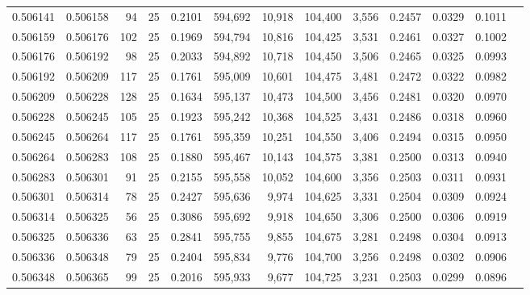 \begin{tabular}{rrrrrrrrrrrrr}
0.506141 & 0.506158 &  94 &  25 &                                     0.2101 & 594,692 &  10,918 & 104,400 &   3,556 & 0.2457 & 0.0329 & 0.1011 \\
0.506159 & 0.506176 & 102 &  25 &                                     0.1969 & 594,794 &  10,816 & 104,425 &   3,531 & 0.2461 & 0.0327 & 0.1002 \\
0.506176 & 0.506192 &  98 &  25 &                                     0.2033 & 594,892 &  10,718 & 104,450 &   3,506 & 0.2465 & 0.0325 & 0.0993 \\
0.506192 & 0.506209 & 117 &  25 &                                     0.1761 & 595,009 &  10,601 & 104,475 &   3,481 & 0.2472 & 0.0322 & 0.0982 \\
0.506209 & 0.506228 & 128 &  25 &                                     0.1634 & 595,137 &  10,473 & 104,500 &   3,456 & 0.2481 & 0.0320 & 0.0970 \\
0.506228 & 0.506245 & 105 &  25 &                                     0.1923 & 595,242 &  10,368 & 104,525 &   3,431 & 0.2486 & 0.0318 & 0.0960 \\
0.506245 & 0.506264 & 117 &  25 &                                     0.1761 & 595,359 &  10,251 & 104,550 &   3,406 & 0.2494 & 0.0315 & 0.0950 \\
0.506264 & 0.506283 & 108 &  25 &                                     0.1880 & 595,467 &  10,143 & 104,575 &   3,381 & 0.2500 & 0.0313 & 0.0940 \\
0.506283 & 0.506301 &  91 &  25 &                                     0.2155 & 595,558 &  10,052 & 104,600 &   3,356 & 0.2503 & 0.0311 & 0.0931 \\
0.506301 & 0.506314 &  78 &  25 &                                     0.2427 & 595,636 &   9,974 & 104,625 &   3,331 & 0.2504 & 0.0309 & 0.0924 \\
0.506314 & 0.506325 &  56 &  25 &                                     0.3086 & 595,692 &   9,918 & 104,650 &   3,306 & 0.2500 & 0.0306 & 0.0919 \\
0.506325 & 0.506336 &  63 &  25 &                                     0.2841 & 595,755 &   9,855 & 104,675 &   3,281 & 0.2498 & 0.0304 & 0.0913 \\
0.506336 & 0.506348 &  79 &  25 &                                     0.2404 & 595,834 &   9,776 & 104,700 &   3,256 & 0.2498 & 0.0302 & 0.0906 \\
0.506348 & 0.506365 &  99 &  25 &                                     0.2016 & 595,933 &   9,677 & 104,725 &   3,231 & 0.2503 & 0.0299 & 0.0896 \\

\end{tabular}
